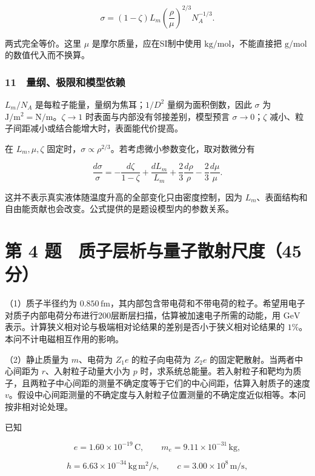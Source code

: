 \documentclass[12pt,a4paper,fontset=fandol]{ctexart}
\begin{document}
\[\boxed{\sigma=(1-\zeta)L_m
\left(\frac\rho\mu\right)^{2/3}N_A^{-1/3}.}\]

两式完全等价。这里 \(\mu\) 是摩尔质量，应在SI制中使用
\(\mathrm{kg/mol}\)，不能直接把 \(\mathrm{g/mol}\) 的数值代入而不换算。

\subsubsection{11　量纲、极限和模型依赖}\label{ux91cfux7eb2ux6781ux9650ux548cux6a21ux578bux4f9dux8d56}

\(L_m/N_A\) 是每粒子能量，量纲为焦耳；\(1/D^2\) 量纲为面积倒数，因此
\(\sigma\) 为 \(\mathrm{J/m^2}= \mathrm{N/m}\)。\(\zeta\to1\)
时表面与内部没有邻接差别，模型预言 \(\sigma\to0\)；\(\zeta\)
减小、粒子间距减小或结合能增大时，表面能代价提高。

在 \(L_m,\mu,\zeta\)
固定时，\(\sigma\propto\rho^{2/3}\)。若考虑微小参数变化，取对数微分有

\[\frac{d\sigma}{\sigma}
=-\frac{d\zeta}{1-\zeta}
+\frac{dL_m}{L_m}
+\frac23\frac{d\rho}{\rho}
-\frac23\frac{d\mu}{\mu}.\]

这并不表示真实液体随温度升高的全部变化只由密度控制，因为
\(L_m\)、表面结构和自由能贡献也会改变。公式提供的是题设模型内的参数关系。

\clearpage

\section{第 4
题　质子层析与量子散射尺度（45分）}\label{ux7b2c-4-ux9898-ux8d28ux5b50ux5c42ux6790ux4e0eux91cfux5b50ux6563ux5c04ux5c3aux5ea645ux5206}

（1）质子半径约为
\(0.850\,\mathrm{fm}\)，其内部包含带电荷和不带电荷的粒子。希望用电子对质子内部电荷分布进行200层断层扫描，估算被加速电子所需的动能，用
\(\mathrm{GeV}\)
表示。计算狭义相对论与极端相对论结果的差别是否小于狭义相对论结果的
\(1\%\)。本问不计电磁相互作用的影响。

（2）静止质量为 \(m\)、电荷为 \(Z_1e\) 的粒子向电荷为 \(Z_2e\)
的固定靶散射。当两者中心间距为 \(r\)、入射粒子动量大小为 \(p\)
时，求系统总能量。若入射粒子和靶均为质子，且两粒子中心间距的测量不确定度等于它们的中心间距，估算入射质子的速度
\(v\)。假设中心间距测量的不确定度与入射粒子位置测量的不确定度近似相等。本问按非相对论处理。

已知

\[e=1.60\times10^{-19}\,\mathrm C,
\qquad m_e=9.11\times10^{-31}\,\mathrm{kg},\]

\[h=6.63\times10^{-34}\,\mathrm{kg\,m^2/s},
\qquad c=3.00\times10^8\,\mathrm{m/s},\]
\end{document}
